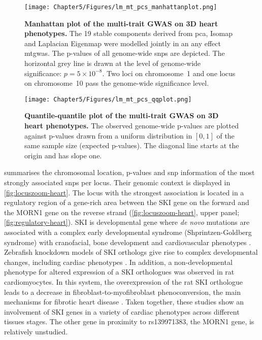 \begin{figure}[hbtp]
	\centering
	\texttt{[image: Chapter5/Figures/lm\_mt\_pcs\_manhattanplot.png]}
	\caption[\textbf{Manhattan plot of the multi-trait GWAS on 3D heart phenotypes .}]{\textbf{Manhattan plot of the multi-trait GWAS on 3D heart phenotypes. }The \num{19} stable components derived from \gls{pca}, Isomap and Laplacian Eigenmap were modelled jointly in an any effect \gls{mtgwas}. The p-values of all genome-wide \glspl{snp} are depicted. The horizontal grey line is drawn at the level of genome-wide significance: \(p = 5 \times 10^{-8}\). Two loci on chromosome~1 and one locus on chromosome~10 pass the genome-wide significance level.} 
	 	\label{fig:manhattan-heart}
\end{figure}
%
\begin{figure}[hbtp]
	\centering
	\texttt{[image: Chapter5/Figures/lm\_mt\_pcs\_qqplot.png]}
	\caption[\textbf{Quantile-quantile plot of the multi-trait GWAS on 3D heart phenotypes .}]{\textbf{Quantile-quantile plot of the multi-trait GWAS on 3D heart phenotypes. } The observed genome-wide p-values are plotted against p-values drawn from a uniform distribution in \([0,1]\) of the same sample size (expected p-values). The diagonal line starts at the origin and has slope one.} 
	 	\label{fig:qq-heart}
\end{figure}
%
 summarises the chromosomal location, p-values and \gls{snp} information of the most strongly associated \glspl{snp} per locus. Their genomic context is displayed in \cref{fig:locuszoom-heart}. The locus with the strongest association is located in a regulatory region of a gene-rich area between the SKI gene on the forward and the MORN1 gene on the reverse strand (\cref{fig:locuszoom-heart}, upper panel; \cref{fig:regulatory-heart}). SKI is developmental gene where \textit{de novo} mutations are associated with a complex early developmental syndrome (Shprintzen-Goldberg syndrome) with cranofacial, bone development and cardiovascular phenotypes \citep{Greally1993}. Zebrafish knockdown models of SKI orthologs give rise to complex developmental changes, including cardiac phenotypes \citep{Doyle2012}. In addition, a non-developmental phenotype for altered expression of a SKI orthologues was observed in rat cardiomyocytes. In this system, the overexpression of the rat SKI orthologue leads to a decrease in fibroblast-to-myofibroblast phenoconversion, the main mechanisms for fibrotic heart disease \citep{Cunnington2010,Cunnington2014,Zeglinski2016}. Taken together, these studies show an involvement of SKI genes in a variety of cardiac phenotypes across different tissues stages. The other gene in proximity to rs139971383, the MORN1 gene, is relatively unstudied. 

